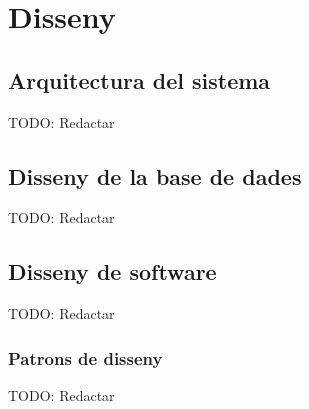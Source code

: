 
\chapter{Disseny} %

\label{Chapter6} %


\section{Arquitectura del sistema}

TODO: Redactar


\section{Disseny de la base de dades}

TODO: Redactar


\section{Disseny de software}

TODO: Redactar

\subsection{Patrons de disseny}

TODO: Redactar
